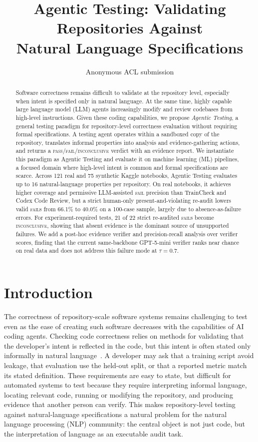 \documentclass[11pt]{article}
\title{Agentic Testing: Validating Repositories Against\\Natural Language Specifications}
\author{Anonymous ACL submission}
\begin{document}
\maketitle

\begin{abstract}
Software correctness remains difficult to validate at the repository level, especially when intent is specified only in natural language.
At the same time, highly capable large language model (LLM) agents increasingly modify and review codebases from high-level instructions.
Given these coding capabilities, we propose \emph{Agentic Testing}, a general testing paradigm for repository-level correctness evaluation without requiring formal specifications.
A testing agent operates within a sandboxed copy of the repository, translates informal properties into analysis and evidence-gathering actions, and returns a \textsc{pass}/\textsc{fail}/\textsc{inconclusive} verdict with an evidence report.
We instantiate this paradigm as Agentic Testing and evaluate it on machine learning (ML) pipelines, a focused domain where high-level intent is common and formal specifications are scarce.
Across 121 real and 75 synthetic Kaggle notebooks, Agentic Testing evaluates up to 16 natural-language properties per repository.
On real notebooks, it achieves higher coverage and permissive LLM-assisted \textsc{fail} precision than TrainCheck and Codex Code Review, but a strict human-only present-and-violating re-audit lowers valid \textsc{fail}s from 66.1\% to 40.0\% on a 100-case sample, largely due to absence-as-failure errors.
For experiment-required tests, 21 of 22 strict re-audited \textsc{fail}s become \textsc{inconclusive}, showing that absent evidence is the dominant source of unsupported failures.
We add a post-hoc evidence verifier and precision-recall analysis over verifier scores, finding that the current same-backbone GPT-5-mini verifier ranks near chance on real data and does not address this failure mode at $\tau=0.7$.
\end{abstract}

\section{Introduction}

The correctness of repository-scale software systems remains challenging to test even as the ease of creating such software decreases with the capabilities of AI coding agents.
Checking code correctness relies on methods for validating that the developer's intent is reflected in the code, but this intent is often stated only informally in natural language~\citep{zeller2009why}.
A developer may ask that a training script avoid leakage, that evaluation use the held-out split, or that a reported metric match its stated definition.
These requirements are easy to state, but difficult for automated systems to test because they require interpreting informal language, locating relevant code, running or modifying the repository, and producing evidence that another person can verify.
This makes repository-level testing against natural-language specifications a natural problem for the natural language processing (NLP) community: the central object is not just code, but the interpretation of language as an executable audit task.
\end{document}
